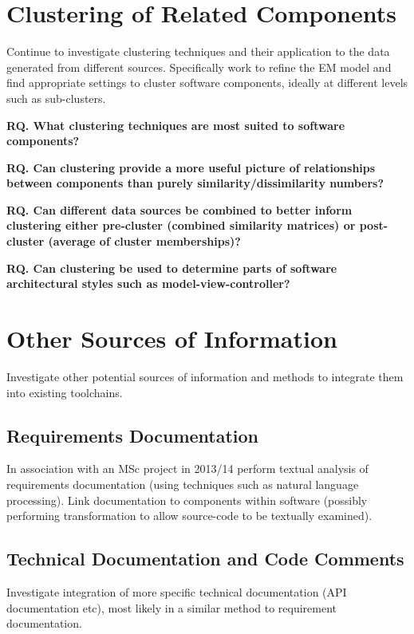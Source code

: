 \section{Clustering of Related Components}

Continue to investigate clustering techniques and their application to the data generated from different sources. Specifically work to refine the EM model and find appropriate settings to cluster software components, ideally at different levels such as sub-clusters.

\textbf{RQ. What clustering techniques are most suited to software components?}

\textbf{RQ. Can clustering provide a more useful picture of relationships between components than purely similarity/dissimilarity numbers?}

\textbf{RQ. Can different data sources be combined to better inform clustering either pre-cluster (combined similarity matrices) or post-cluster (average of cluster memberships)?}

\textbf{RQ. Can clustering be used to determine parts of software architectural styles such as model-view-controller?}

\section{Other Sources of Information}

Investigate other potential sources of information and methods to integrate them into existing toolchains.

\subsection{Requirements Documentation}

In association with an MSc project in 2013/14 perform textual analysis of requirements documentation (using techniques such as natural language processing). Link documentation to components within software (possibly performing transformation to allow source-code to be textually examined).

\subsection{Technical Documentation and Code Comments}

Investigate integration of more specific technical documentation (API documentation etc), most likely in a similar method to requirement documentation.

